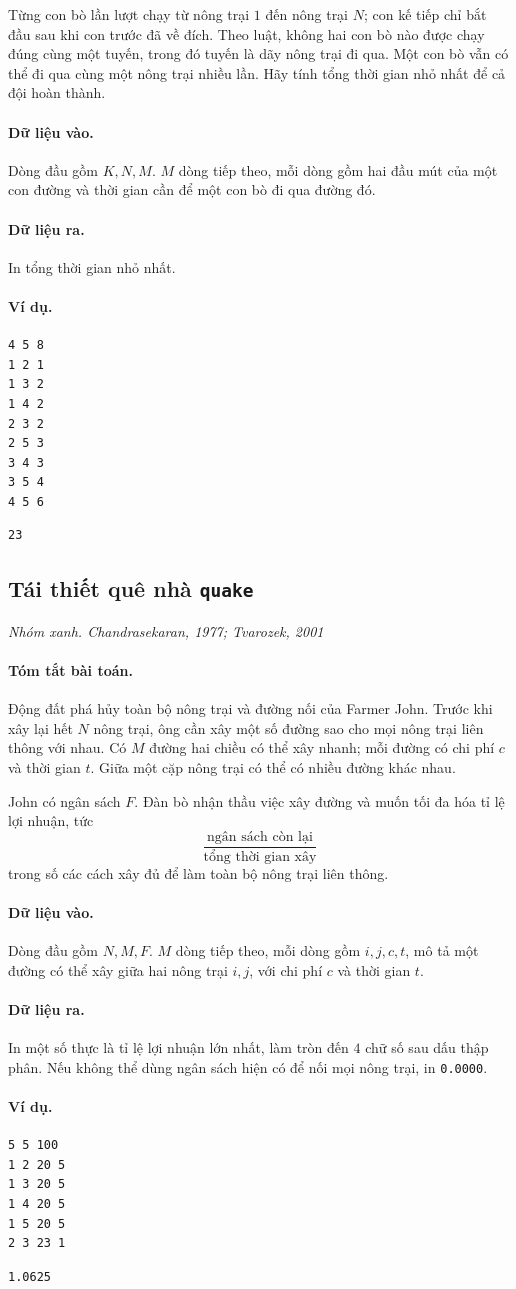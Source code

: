 \documentclass[11pt]{article}
\newcommand{\problem}[4]{%
  \subsection[#1 (#2)]{#1 \hfill {\normalsize\texttt{#2}}}%
  \noindent\textit{#3. #4}\par\smallskip
}
\newcommand{\iosec}[1]{\paragraph{#1}}
\begin{document}
Từng con bò lần lượt chạy từ nông trại \(1\) đến nông trại \(N\); con kế tiếp
chỉ bắt đầu sau khi con trước đã về đích. Theo luật, không hai con bò nào được
chạy đúng cùng một tuyến, trong đó tuyến là dãy nông trại đi qua. Một con bò
vẫn có thể đi qua cùng một nông trại nhiều lần. Hãy tính tổng thời gian nhỏ
nhất để cả đội hoàn thành.

\iosec{Dữ liệu vào.}
Dòng đầu gồm \(K,N,M\). \(M\) dòng tiếp theo, mỗi dòng gồm hai đầu mút của một
con đường và thời gian cần để một con bò đi qua đường đó.

\iosec{Dữ liệu ra.}
In tổng thời gian nhỏ nhất.

\iosec{Ví dụ.}
\begin{verbatim}
4 5 8
1 2 1
1 3 2
1 4 2
2 3 2
2 5 3
3 4 3
3 5 4
4 5 6
\end{verbatim}

\begin{verbatim}
23
\end{verbatim}

\problem{Tái thiết quê nhà}{quake}{Nhóm xanh}{Chandrasekaran, 1977; Tvarozek, 2001}

\iosec{Tóm tắt bài toán.}
Động đất phá hủy toàn bộ nông trại và đường nối của Farmer John. Trước khi xây
lại hết \(N\) nông trại, ông cần xây một số đường sao cho mọi nông trại liên
thông với nhau. Có \(M\) đường hai chiều có thể xây nhanh; mỗi đường có chi
phí \(c\) và thời gian \(t\). Giữa một cặp nông trại có thể có nhiều đường
khác nhau.

John có ngân sách \(F\). Đàn bò nhận thầu việc xây đường và muốn tối đa hóa
tỉ lệ lợi nhuận, tức
\[
  \frac{\text{ngân sách còn lại}}{\text{tổng thời gian xây}}
\]
trong số các cách xây đủ để làm toàn bộ nông trại liên thông.

\iosec{Dữ liệu vào.}
Dòng đầu gồm \(N,M,F\). \(M\) dòng tiếp theo, mỗi dòng gồm
\(i,j,c,t\), mô tả một đường có thể xây giữa hai nông trại \(i,j\), với chi
phí \(c\) và thời gian \(t\).

\iosec{Dữ liệu ra.}
In một số thực là tỉ lệ lợi nhuận lớn nhất, làm tròn đến \(4\) chữ số sau dấu
thập phân. Nếu không thể dùng ngân sách hiện có để nối mọi nông trại, in
\texttt{0.0000}.

\iosec{Ví dụ.}
\begin{verbatim}
5 5 100
1 2 20 5
1 3 20 5
1 4 20 5
1 5 20 5
2 3 23 1
\end{verbatim}

\begin{verbatim}
1.0625
\end{verbatim}
\end{document}
